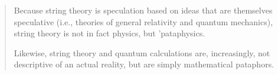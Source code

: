 \begin{quotation}
  Because string theory is speculation based on ideas that are themselves speculative (i.e., theories of general relativity and quantum mechanics), string theory is not in fact physics, but 'pataphysics.

  Likewise, string theory and quantum calculations are, increasingly, not descriptive of an actual reality, but are simply mathematical pataphors. 
\end{quotation}

\stopcontents[chapters]

